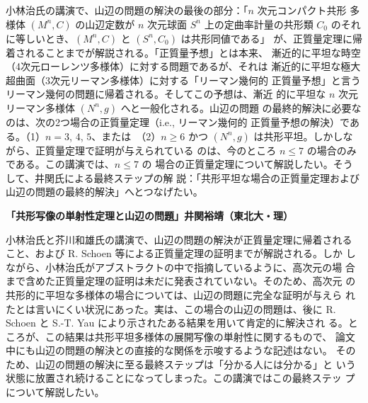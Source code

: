 \documentclass[uplatex,dvipdfmx]{jlreq}
\begin{document}
小林治氏の講演で、山辺の問題の解決の最後の部分：「$n$ 次元コンパクト共形
多様体 $(M^n, C)$ の山辺定数が $n$ 次元球面 $S^n$ 上の定曲率計量の共形類
$C_0$ のそれに等しいとき、$(M^n, C)$ と $(S^n, C_0)$ は共形同値である」
が、正質量定理に帰着されることまでが解説される。「正質量予想」とは本来、
漸近的に平坦な時空（4次元ローレンツ多様体）に対する問題であるが、それは
漸近的に平坦な極大超曲面（3次元リーマン多様体）に対する「リーマン幾何的
正質量予想」と言うリーマン幾何の問題に帰着される。そしてこの予想は、漸近
的に平坦な $n$ 次元リーマン多様体 $(N^n, g)$ へと一般化される。山辺の問題
の最終的解決に必要なのは、次の2つ場合の正質量定理（i.e., リーマン幾何的
正質量予想の解決）である。（1）$n = 3$, $4$, $5$、または　（2）$n \geq 6$
かつ $(N^n, g)$ は共形平坦。しかしながら、正質量定理で証明が与えられている
のは、今のところ $n \leq 7$ の場合のみである。この講演では、$n \leq 7$ の
場合の正質量定理について解説したい。そうして、井関氏による最終ステップの解
説：「共形平坦な場合の正質量定理および山辺の問題の最終的解決」へとつなげたい。

\newpage

\noindent
{\bfseries\large「共形写像の単射性定理と山辺の問題」\hfill 井関裕靖（東北大・理）}

\vspace{6pt}

小林治氏と芥川和雄氏の講演で、山辺の問題の解決が正質量定理に帰着される
こと、および R. Schoen 等による正質量定理の証明までが解説される。しか
しながら、小林治氏がアブストラクトの中で指摘しているように、高次元の場
合まで含めた正質量定理の証明は未だに発表されていない。そのため、高次元
の共形的に平坦な多様体の場合については、山辺の問題に完全な証明が与えら
れたとは言いにくい状況にあった。実は、この場合の山辺の問題は、後に
R. Schoen と S.-T. Yau により示されたある結果を用いて肯定的に解決され
る。ところが、この結果は共形平坦多様体の展開写像の単射性に関するもので、
論文中にも山辺の問題の解決との直接的な関係を示唆するような記述はない。
そのため、山辺の問題の解決に至る最終ステップは「分かる人には分かる」と
いう状態に放置され続けることになってしまった。この講演ではこの最終ステッ
プについて解説したい。
\end{document}
